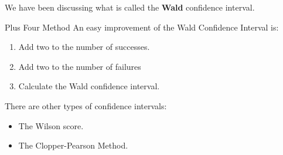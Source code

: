\documentclass{beamer}
\begin{document}
\begin{frame}
\begin{note}
We have been discussing what is called the \textbf{Wald} confidence interval.
\end{note}\pause

\begin{block}{Plus Four Method}
An easy improvement of the Wald Confidence Interval is:
\begin{enumerate}
\item Add two to the number of successes.
\item Add two to the number of failures
\item Calculate the Wald confidence interval.
\end{enumerate}
\end{block}\pause

\begin{note}
There are other types of confidence intervals:
\begin{itemize}
\item The Wilson score.
\item The Clopper-Pearson Method.
\end{itemize}
\end{note}
\end{frame}
\end{document}
